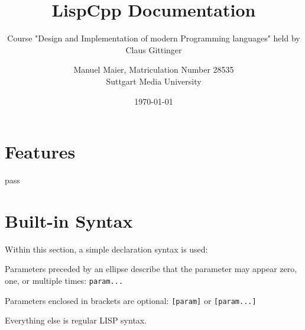 \documentclass[a4paper]{scrartcl}
\title{LispCpp Documentation}
\subtitle{Course "Design and Implementation of modern Programming languages" held by Claus Gittinger}
\author{Manuel Maier, Matriculation Number 28535\\
	Suttgart Media University}
\date{\today}
\begin{document}
\maketitle
\tableofcontents

\section{Features}
	pass
	
\section{Built-in Syntax}
	Within this section, a simple declaration syntax is used:

	Parameters preceded by an ellipse describe that the parameter may appear zero, one, or multiple times: \lstinline|param...|

	Parameters enclosed in brackets are optional: \lstinline|[param]| or \lstinline|[param...]|

	Everything else is regular LISP syntax.



\end{document}
